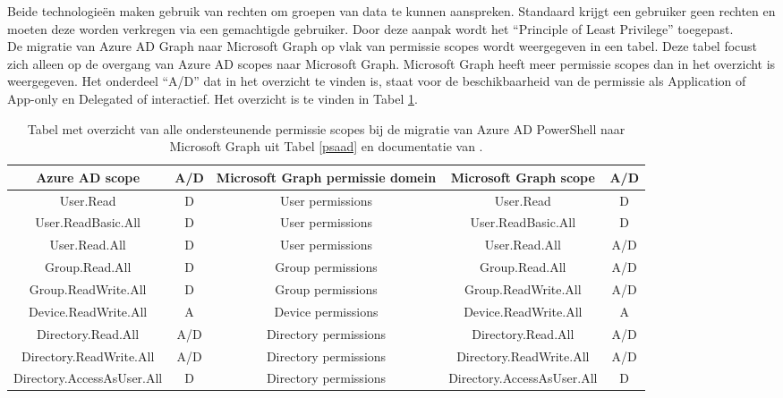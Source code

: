
Beide technologieën maken gebruik van rechten om groepen van data te kunnen aanspreken. Standaard krijgt een gebruiker geen rechten en moeten deze worden verkregen via een gemachtigde gebruiker. Door deze aanpak wordt het “Principle of Least Privilege” toegepast. \\

De migratie van Azure \ac{AD} Graph naar Microsoft Graph op vlak van permissie scopes wordt weergegeven in een tabel. Deze tabel focust zich alleen op de overgang van Azure \ac{AD} scopes naar Microsoft Graph. Microsoft Graph heeft meer permissie scopes dan in het overzicht is weergegeven. Het onderdeel “A/D” dat in het overzicht te vinden is, staat voor de beschikbaarheid van de permissie als Application of App-only en Delegated of interactief. Het overzicht is te vinden in Tabel \ref{AADMSGPS}. \\

\begin{table}[h]
    \centering
    \begin{adjustbox}{max width=\textwidth}
    \begin{tabular}{ |c|c||c|c|c| } 
        \hline
        \textbf{Azure AD scope} & \textbf{A/D} & \textbf{Microsoft Graph permissie domein} & \textbf{Microsoft Graph scope} & \textbf{A/D} \\
        \hline
        User.Read & D & User permissions & User.Read & D \\
        User.ReadBasic.All & D & User permissions & User.ReadBasic.All & D \\
        User.Read.All & D & User permissions & User.Read.All & A/D \\
        Group.Read.All & D & Group permissions & Group.Read.All & A/D \\
        Group.ReadWrite.All & D & Group permissions & Group.ReadWrite.All & A/D \\
        Device.ReadWrite.All & A & Device permissions & Device.ReadWrite.All & A \\
        Directory.Read.All & A/D & Directory permissions & Directory.Read.All & A/D \\
        Directory.ReadWrite.All & A/D & Directory permissions & Directory.ReadWrite.All & A/D \\
        Directory.AccessAsUser.All & D & Directory permissions & Directory.AccessAsUser.All & D \\ 
        \hline
    \end{tabular}
    \end{adjustbox}
    \caption[Tabel migratie Azure AD permissie scopes naar Microsoft Graph]{Tabel met overzicht van alle ondersteunende permissie scopes bij de migratie van Azure \ac{AD} PowerShell naar Microsoft Graph uit Tabel \ref{psaad} en documentatie van \textcite{Microsoft2023p}.}
    \label{AADMSGPS}
\end{table}

